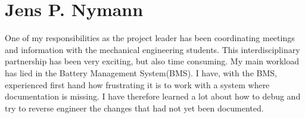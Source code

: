 \section{Jens P. Nymann}
One of my responsibilities as the project leader has been coordinating meetings and information with the mechanical engineering students. This interdisciplinary partnership has been very exciting, but also time consuming. My main workload has lied in the Battery Management System(BMS). I have, with the BMS, experienced first hand how frustrating it is to work with a system where documentation is missing. I have therefore learned a lot about how to debug and try to reverse engineer the changes that had not yet been documented.